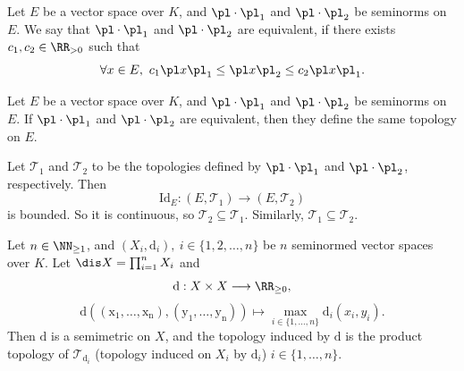 \begin{definitionenv}
    Let $E$ be a vector space over $K$, and $\pl\cdot\pl_1$ and $\pl\cdot\pl_2$  be seminorms on $E$. We say that $\pl\cdot\pl_1$ and $\pl\cdot\pl_2$ are equivalent, if there exists $c_1, c_2\in \RR_{>0}$ such that 
    $$\forall x\in E,\ c_1\pl x\pl_1\le\pl x\pl_2\le c_2\pl x\pl_1.$$
\end{definitionenv}
\begin{propositionenv}
    Let $E$ be a vector space over $K$, and $\pl\cdot\pl_1$ and $\pl\cdot\pl_2$  be seminorms on $E$. If $\pl\cdot\pl_1$ and $\pl\cdot\pl_2$ are equivalent, then they define the same topology on $E$.
\end{propositionenv}
\begin{proofenv}
    Let $\mathscr{T}_1$ and $\mathscr{T}_2$ to be the topologies defined by $\pl\cdot\pl_1$ and $\pl\cdot\pl_2$, respectively. Then 
    $$\mathrm{Id}_E:(E,\mathscr{T}_1)\longrightarrow(E,\mathscr{T}_2)$$
    is bounded. So it is continuous, so $\mathscr{T}_2\subseteq\mathscr{T}_1$. Similarly, $\mathscr{T}_1\subseteq\mathscr{T}_2$.
\end{proofenv}
\begin{propositionenv}
    Let $n\in\NN_{\ge 1}$, and $(X_i,\mathrm{d}_i),\ i\in\{1,2,\ldots,n\}$ be $n$ seminormed vector spaces over $K$. Let $\dis X=\prod_{i=1}^nX_i$ and
    $$\mathrm{d}:X\times X\longrightarrow \RR_{\ge 0},$$
    $$\mathrm{d\left((x_1,\ldots,x_n),(y_1,\ldots,y_n)\right)}\longmapsto \max_{i\in\{1,\ldots,n\}}\mathrm{d}_i(x_i,y_i).$$
    Then $\mathrm{d}$ is a semimetric on $X$, and the topology  induced by $\mathrm{d}$ is the product topology of $\mathscr{T}_{\mathrm{d}_i}$ (topology induced on $X_i$ by $\mathrm{d}_i$) $i\in\{1,\dots,n\}$.

\end{propositionenv}
